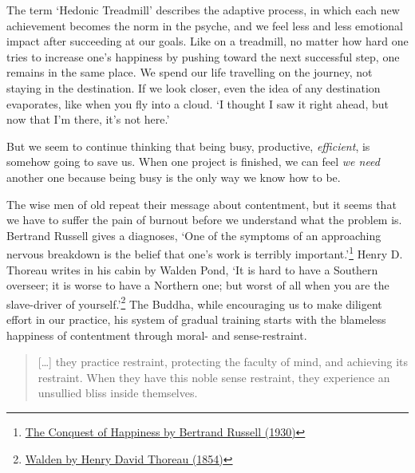 The term `Hedonic Treadmill' describes the adaptive process, in which
each new achievement becomes the norm in the psyche, and we feel less
and less emotional impact after succeeding at our goals. Like on a
treadmill, no matter how hard one tries to increase one's happiness by
pushing toward the next successful step, one remains in the same place.
We spend our life travelling on the journey, not staying in the
destination. If we look closer, even the idea of any destination
evaporates, like when you fly into a cloud. `I thought I saw it right
ahead, but now that I'm there, it's not here.'

But we seem to continue thinking that being busy, productive,
\emph{efficient}, is somehow going to save us. When one project is
finished, we can feel \emph{we need} another one because being busy is
the only way we know how to be.

\enlargethispage*{\baselineskip}

The wise men of old repeat their message about contentment, but it seems
that we have to suffer the pain of burnout before we understand what the
problem is. Bertrand Russell gives a diagnoses, `One of the symptoms of
an approaching nervous breakdown is the belief that one's work is
terribly important.'\footnote{\href{https://www.goodreads.com/book/show/51783.The_Conquest_of_Happiness}{The
  Conquest of Happiness by Bertrand Russell (1930)}} Henry D. Thoreau
writes in his cabin by Walden Pond, `It is hard to have a Southern
overseer; it is worse to have a Northern one; but worst of all when you
are the slave-driver of yourself.'\footnote{\href{https://www.goodreads.com/book/show/16902.Walden}{Walden
  by Henry David Thoreau (1854)}} The Buddha, while encouraging us to
make diligent effort in our practice, his system of gradual training
starts with the blameless happiness of contentment through moral- and
sense-restraint.

\begin{quote}
{[}\ldots{]} they practice restraint, protecting the faculty of mind,
and achieving its restraint. When they have this noble sense restraint,
they experience an unsullied bliss inside themselves.

\bigskip

\end{quote}


